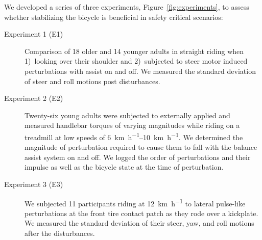 \documentclass{icsc}
\def\kph{\kilo\meter\per\hour}
\begin{document}
We developed a series of three experiments, Figure~\ref{fig:experiments}, to
assess whether stabilizing the bicycle is beneficial in safety critical
scenarios:
\begin{description}
  \item[Experiment 1 (E1)] Comparison of 18 older and 14 younger adults in
    straight riding when 1)~looking over their shoulder and 2)~subjected
    to steer motor induced perturbations with assist on and off. We measured
    the standard deviation of steer and roll motions post disturbances.
  \item[Experiment 2 (E2)] Twenty-six young adults were subjected to externally
    applied and measured handlebar torques of varying magnitudes while riding
    on a treadmill at low speeds of \qtyrange{6}{10}{\kph}. We determined the
    magnitude of perturbation required to cause them to fall with the balance
    assist system on and off. We logged the order of perturbations and their
    impulse as well as the bicycle state at the time of perturbation.
  \item[Experiment 3 (E3)] We subjected 11 participants riding at 12~\si{\kph}
    to lateral pulse-like perturbations at the front tire contact patch as they
    rode over a kickplate. We measured the standard deviation of their
    steer, yaw, and roll motions after the disturbances.
\end{description}
\end{document}
